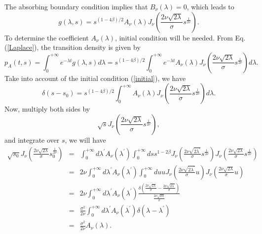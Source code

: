 \documentclass[12pt]{article}
\begin{document}
  The absorbing boundary condition implies that $B_{\nu}(\lambda)=0$, which leads to
  \begin{equation}
    g(\lambda, s)=s^{(1-4\beta)/2}A_{\nu}(\lambda)J_{\nu}\left(\frac{2\nu\sqrt{2\lambda}}{\sigma}s^{\frac{1}{2\nu}}\right).
  \end{equation}
  To determine the coefficient $A_{\nu}(\lambda)$, initial condition will be needed. From Eq. (\ref{Laplace}), the transition
  density is given by
  \begin{equation}
    p_A(t,s)=\int_0^{+\infty}e^{-\lambda t}g(\lambda,s)d\lambda
          =s^{(1-4\beta)/2}\int_0^{+\infty}e^{-\lambda t}
          A_{\nu}(\lambda)J_{\nu}\left(\frac{2\nu\sqrt{2\lambda}}{\sigma}s^{\frac{1}{2\nu}}\right)d\lambda.
  \end{equation}
  Take into account of the initial condition (\ref{initial}), we have
  \begin{equation}
    \delta(s-s_0)=s^{(1-4\beta)/2}\int_0^{+\infty}
          A_{\nu}(\lambda)J_{\nu}\left(\frac{2\nu\sqrt{2\lambda}}{\sigma}s^{\frac{1}{2\nu}}\right)d\lambda.
  \end{equation}
  Now, multiply both sides by
  $$
    \sqrt{s}J_{\nu}\left(\frac{2\nu\sqrt{2\lambda}}{\sigma}s^{\frac{1}{2\nu}}\right),
  $$
  and integrate over $s$, we will have
  \begin{eqnarray}
      \sqrt{s_0}J_{\nu}\left(\frac{2\nu\sqrt{2\lambda}}{\sigma}s_0^{\frac{1}{2\nu}}\right)
    &=&  \int_0^{+\infty}d\lambda^{\prime} A_{\nu}(\lambda^{\prime})
         \int_0^{+\infty}ds s^{1-2\beta}
         J_{\nu}\left(\frac{2\nu\sqrt{2\lambda^{\prime}}}{\sigma}s^{\frac{1}{2\nu}}\right)
         J_{\nu}\left(\frac{2\nu\sqrt{2\lambda}}{\sigma}s^{\frac{1}{2\nu}}\right)\nonumber\\
    &=& 2\nu \int_0^{+\infty}d\lambda^{\prime} A_{\nu}(\lambda^{\prime})
         \int_0^{+\infty}du u
         J_{\nu}\left(\frac{2\nu\sqrt{2\lambda^{\prime}}}{\sigma}u\right)
         J_{\nu}\left(\frac{2\nu\sqrt{2\lambda}}{\sigma}u\right) \nonumber\\
    &=& 2\nu \int_0^{+\infty}d\lambda^{\prime} A_{\nu}(\lambda^{\prime})
          \frac{\displaystyle \delta\left(\frac{2\nu\sqrt{2\lambda}}{\sigma} - \frac{2\nu\sqrt{2\lambda^{\prime}}}{\sigma}\right)}
            {\displaystyle \frac{2\nu\sqrt{2\lambda}}{\sigma}}\nonumber\\
    &=& \frac{\sigma^2}{2\nu}\int_0^{+\infty}d\lambda^{\prime} A_{\nu}(\lambda^{\prime})
          \delta(\lambda - \lambda^{\prime})\nonumber\\
    &=& \frac{\sigma^2}{2\nu}A_{\nu}(\lambda).
  \end{eqnarray}
\end{document}
